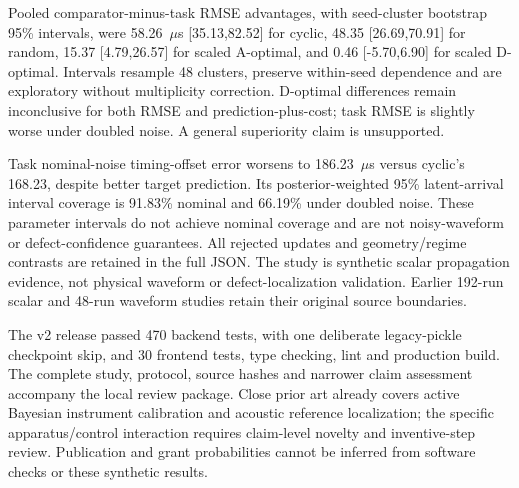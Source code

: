 Pooled comparator-minus-task RMSE advantages, with seed-cluster bootstrap 95\% intervals, were 58.26~$\mu$s [35.13,82.52] for cyclic, 48.35 [26.69,70.91] for random, 15.37 [4.79,26.57] for scaled A-optimal, and 0.46 [-5.70,6.90] for scaled D-optimal. Intervals resample 48 clusters, preserve within-seed dependence and are exploratory without multiplicity correction. D-optimal differences remain inconclusive for both RMSE and prediction-plus-cost; task RMSE is slightly worse under doubled noise. A general superiority claim is unsupported.

Task nominal-noise timing-offset error worsens to 186.23~$\mu$s versus cyclic's 168.23, despite better target prediction. Its posterior-weighted 95\% latent-arrival interval coverage is 91.83\% nominal and 66.19\% under doubled noise. These parameter intervals do not achieve nominal coverage and are not noisy-waveform or defect-confidence guarantees. All rejected updates and geometry/regime contrasts are retained in the full JSON. The study is synthetic scalar propagation evidence, not physical waveform or defect-localization validation. Earlier 192-run scalar and 48-run waveform studies retain their original source boundaries.

The v2 release passed 470 backend tests, with one deliberate legacy-pickle checkpoint skip, and 30 frontend tests, type checking, lint and production build. The complete study, protocol, source hashes and narrower claim assessment accompany the local review package. Close prior art already covers active Bayesian instrument calibration and acoustic reference localization; the specific apparatus/control interaction requires claim-level novelty and inventive-step review. Publication and grant probabilities cannot be inferred from software checks or these synthetic results.
